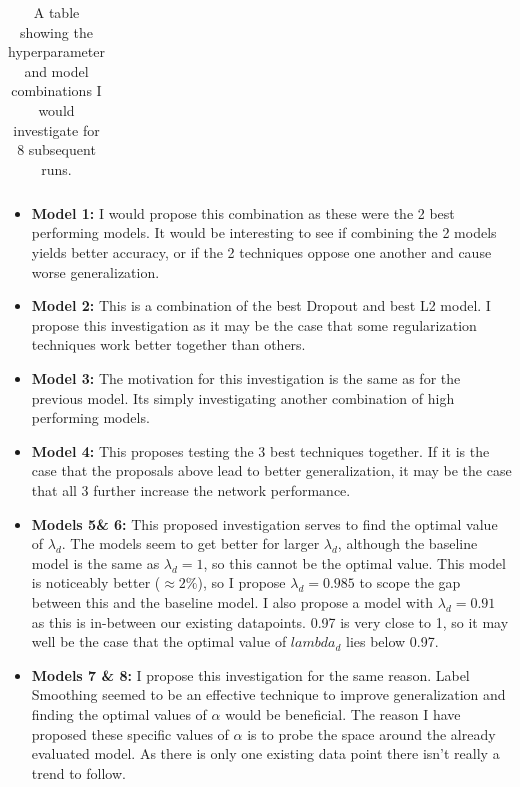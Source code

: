 {{\begin{table}[t]
\begin{tabular}{c|c|c}
   
 
    \bottomrule
    \end{tabular}
    \caption{A table showing the hyperparameter and model combinations I would investigate for 8 subsequent runs.}
    \label{tab:q7}
\end{table}


\begin{itemize}
\item \textbf{Model 1:} I would propose this combination as these were the 2 best performing models. It would be interesting to see if combining the 2 models yields better accuracy, or if the 2 techniques oppose one another and cause worse generalization.

\item \textbf{Model 2:} This is a combination of the best Dropout and best L2 model. I propose this investigation as it may be the case that some regularization techniques work better together than others.

\item \textbf{Model 3:} The motivation for this investigation is the same as for the previous model. Its simply investigating another combination of high performing models.

\item \textbf{Model 4:} This proposes testing the 3 best techniques together. If it is the case that the proposals above lead to better generalization, it may be the case that all 3 further increase the network performance.

\item \textbf{Models 5\& 6:} This proposed investigation serves to find the optimal value of $\lambda_d$. The models seem to get better for larger $\lambda_d$, although the baseline model is the same as $\lambda_d = 1$, so this cannot be the optimal value. This model is noticeably better ($\approx 2\%$), so I propose $\lambda_d = 0.985$ to scope the gap between this and the baseline model. I also propose a model with $\lambda_d = 0.91$ as this is in-between our existing datapoints. 0.97 is very close to 1, so it may well be the case that the optimal value of $lambda_d$ lies below 0.97.

\item \textbf{Models 7 \& 8:} I propose this investigation for the same reason. Label Smoothing seemed to be an effective technique to improve generalization and finding the optimal values of $\alpha$ would be beneficial. The reason I have proposed these specific values of $\alpha$ is to probe the space around the already evaluated model. As there is only one existing data point there isn't really a trend to follow.


\end{itemize}}}
